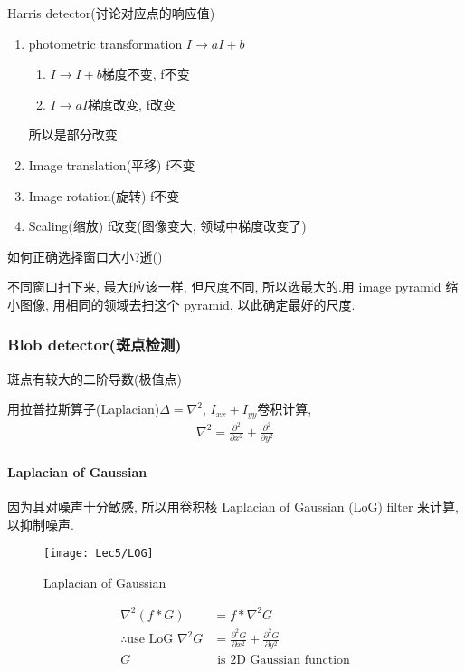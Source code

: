 Harris detector(讨论对应点的响应值)
\begin{enumerate}
    \item photometric transformation $I \longrightarrow  aI+b$
    \begin{enumerate}
        \item $I \longrightarrow  I+b$梯度不变, f不变
        \item $I \longrightarrow  aI$梯度改变, f改变
    \end{enumerate}

    所以是部分改变
    \item  Image translation(平移) f不变
    \item Image rotation(旋转) f不变
    \item Scaling(缩放) f改变(图像变大, 领域中梯度改变了)
\end{enumerate}

如何正确选择窗口大小?逝()

不同窗口扫下来, 最大f应该一样, 但尺度不同, 所以选最大的.用 image pyramid 缩小图像, 用相同的领域去扫这个 pyramid, 以此确定最好的尺度. 

\subsubsection{Blob detector(斑点检测)}
斑点有较大的二阶导数(极值点)

用拉普拉斯算子(Laplacian)$\Delta=\nabla^2$, $I_{xx}+I_{yy}$卷积计算, 
\begin{align*}
    \nabla^2=\frac{\partial^2 }{\partial x^2}+\frac{\partial^2 }{\partial y^2}
\end{align*}

\paragraph{Laplacian of Gaussian}
因为其对噪声十分敏感, 所以用卷积核 Laplacian of Gaussian (LoG) filter 来计算, 以抑制噪声.
\begin{figure}[H]
    \centering
    \texttt{[image: Lec5/LOG]}
    \caption{Laplacian of Gaussian}
\end{figure}
\begin{align*}
    \nabla^2(f*G)&=f*\nabla^2G\\
    \therefore\text{use LoG } \nabla^2 G&=\frac{\partial^2 G}{\partial x^2}+\frac{\partial^2 G}{\partial y^2}\\
    G& \text{ is 2D Gaussian function}
\end{align*}

